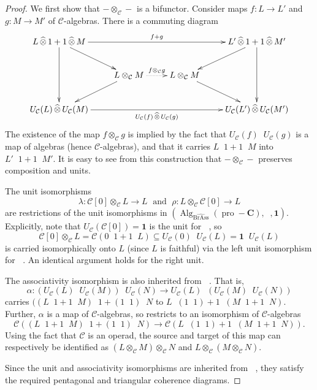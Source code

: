 \documentclass[12pt]{article}
\DeclareMathOperator{\Alg}{Alg}
\DeclareMathOperator{\pro}{pro}
\DeclareMathOperator{\BrAss}{BrAss}
\DeclareMathOperator{\hattimes}{\widehat{\otimes}}
\newcommand{\BrAsshat}{\widehat{\BrAss}} %
\newcommand{\CC} {\mathcal{C}}
\newcommand{\bC} {\mathbf{C}}
\newcommand{\one} {\mathbf{1}}
\newcommand{\proC}{\pro\!-\bC}
\theoremstyle{plain}
\theoremstyle{definition}
\theoremstyle{remark}
\begin{document}
\begin{proof}

We first show that $- \otimes_{\CC} -$ is a bifunctor.  Consider maps $f: L \to L'$ and $g: M \to M'$ of $\CC$-algebras.  There is a commuting diagram
%
$$\xymatrix{
L \hattimes 1 + 1 \hattimes M \ar[rrr]^-{f + g} \ar[dd] \ar[dr] & & & L' \hattimes 1 + 1 \hattimes M'  \ar[dd] \ar[dl] \\
 & L \otimes_{\CC} M \ar[dl] \ar@{.>}[r]^-{f\otimes_{\CC} g} & L \otimes_{\CC} M  \ar[dr] & \\
U_{\CC}(L) \hattimes U_{\CC}(M) \ar[rrr]_-{U_{\CC}(f)\hattimes U_{\CC}(g)} & & & U_{\CC}(L') \hattimes U_{\CC}(M')
}$$
%
The existence of the map $f\otimes_{\CC} g$ is implied by the fact that $U_{\CC}(f) \hattimes U_{\CC}(g)$ is a map of algebras (hence $\CC$-algebras), and that it carries $L \hattimes 1 + 1 \hattimes M$ into $L' \hattimes 1 + 1 \hattimes M'$.  It is easy to see from this construction that $- \otimes_{\CC} -$ preserves composition and units.

The unit isomorphisms
%
$$\lambda: \CC[0] \otimes_{\CC} L \to L \; \mbox{ and } \; \rho: L \otimes_{\CC} \CC[0] \to L$$
%
are restrictions of the unit isomorphisms in $(\Alg_{\BrAsshat}(\proC), \hattimes, \one)$.  Explicitly, note that $U_{\CC}(\CC[0]) = \one$ is the unit for $\hattimes$, so 
%
$$\CC[0] \otimes_{\CC} L = \CC(0 \hattimes 1 + 1 \hattimes L) \subseteq U_{\CC}(0) \hattimes U_{\CC}(L) = \one \hattimes U_{\CC}(L)$$
%
is carried isomorphically onto $L$ (since $L$ is faithful) via the left unit isomorphism for $\hattimes$.  An identical argument holds for the right unit.

The associativity isomorphism is also inherited from $\hattimes$.  That is,
%
$$\alpha: (U_{\CC}(L) \hattimes U_{\CC}(M)) \hattimes U_{\CC}(N) \to U_{\CC}(L) \hattimes (U_{\CC}(M) \hattimes U_{\CC}(N))$$
%
carries $((L \hattimes 1 + 1 \hattimes M) \hattimes 1 + (1 \hattimes 1) \hattimes N$ to $L \hattimes (1 \hattimes 1) + 1 \hattimes (M \hattimes 1 + 1 \hattimes N)$.  Further, $\alpha$ is a map of $\CC$-algebras, so restricts to an isomorphism of $\CC$-algebras
%
$$\CC((L \hattimes 1 + 1 \hattimes M) \hattimes 1 + (1 \hattimes 1) \hattimes N) \to \CC(L \hattimes (1 \hattimes 1) + 1 \hattimes (M \hattimes 1 + 1 \hattimes N)).$$
%
Using the fact that $\CC$ is an operad, the source and target of this map can respectively be identified as $(L \otimes_{\CC} M) \otimes_{\CC} N$ and $L \otimes_{\CC} (M \otimes_{\CC} N)$.

Since the unit and associativity isomorphisms are inherited from $\hattimes$, they satisfy the required pentagonal and triangular coherence diagrams.

\end{proof}
\end{document}
